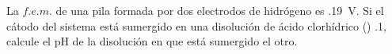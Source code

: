 La $f.e.m.$ de una pila formada por dos electrodos de hidrógeno es \SI{,19}{\volt}. Si el cátodo del sistema está sumergido en una disolución de ácido clorhídrico () \SI{,1}{\Molar}, calcule el $\mathrm{pH}$ de la disolución en que está sumergido el otro.
